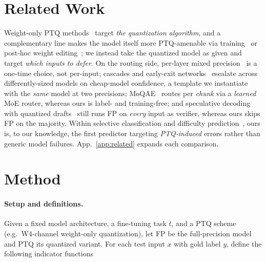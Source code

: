 \documentclass{article}
\newcommand{\fp}{\textsc{FP}\xspace}
\newcommand{\ptq}{\textsc{PTQ}\xspace}
\begin{document}
\section{Related Work}
\label{sec:related}

Weight-only \ptq{} methods~\cite{frantar2023gptq,xiao2023smoothquant,lin2024awq,ashkboos2024quarot,liu2024spinquant,li2023repqvit,ptq4vit,adalog} target \emph{the quantization algorithm}, and a complementary line makes the model itself more \ptq-amenable via training~\cite{catalan2025training,jacob2018quantization} or post-hoc weight editing~\cite{solombrino2026zeroshotquantizationweightspacearithmetic}; we instead take the quantized model as given and target \emph{which inputs to defer}. On the routing side, per-layer mixed precision~\cite{dong2019hawq} is a one-time choice, not per-input; cascades and early-exit networks~\cite{teerapittayanon2016branchynet,huang2018msdnet,kolawole2024revisiting} escalate across differently-sized models on cheap-model confidence, a template we instantiate with the \emph{same} model at two precisions; MoQAE~\cite{tao2025moqae} routes per \emph{chunk} via a \emph{learned} MoE router, whereas ours is label- and training-free; and speculative decoding with quantized drafts~\cite{zhao2025qspec,georganas2025mlspecqdmultilevelspeculativedecoding} still runs \fp{} on \emph{every} input as verifier, whereas ours skips \fp{} on the majority. Within selective classification and difficulty prediction~\cite{geifman2017selective}, ours is, to our knowledge, the first predictor targeting \emph{\ptq-induced} errors rather than generic model failures. App.~\ref{app:related} expands each comparison.

\section{Method}\label{sec:method}

\paragraph{Setup and definitions.}
Given a fixed model architecture, a fine-tuning task \(t\), and a \ptq scheme (e.g.\ W4-channel weight-only quantization), let \fp be the full-precision model and \ptq its quantized variant.
For each test input \(x\) with gold label \(y\), define the following indicator functions
\end{document}
